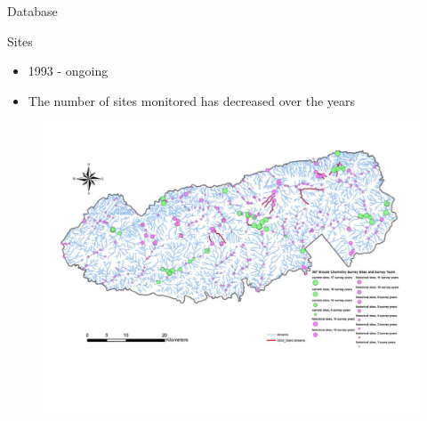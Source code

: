 \begin{frame}{Database}

\begin{block}{Sites}
	\begin{itemize}
		\item 1993 - ongoing
		\item The number of sites monitored has decreased over the years
	\end{itemize}
\end{block}
 
\begin{figure}
\centering			
\includegraphics[width=.75\textwidth]{Figures/SSsites}
\end{figure}
		
\end{frame}